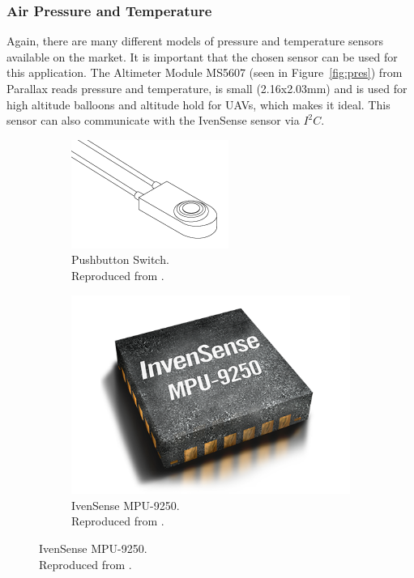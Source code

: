\documentclass[10pt]{article}
\begin{document}
\subsubsection{Air Pressure and Temperature}
Again, there are many different models of pressure and temperature sensors available on the market.  It is important that the chosen sensor can be used for this application.  The Altimeter Module MS5607 (seen in Figure~\ref{fig:pres}) from Parallax reads pressure and temperature, is small (2.16x2.03mm) and is used for high altitude balloons and altitude hold for UAVs, which makes it ideal.  This sensor can also communicate with the IvenSense sensor via $I^2C$.

\begin{figure}[H]
\begin{subfigure}{0.5\textwidth}
\includegraphics[scale =0.3]{3.png}
\caption{Pushbutton Switch.\\ Reproduced from \citep{cpi}.}
\label{fig:p}
\end{subfigure}
\begin{subfigure}{0.5\textwidth}
\centering
\includegraphics[scale =0.1]{2.png}
\caption{IvenSense MPU-9250. \\Reproduced from \citep{iven}.}
\label{fig:att}
\end{subfigure}

\end{figure}
\end{document}
